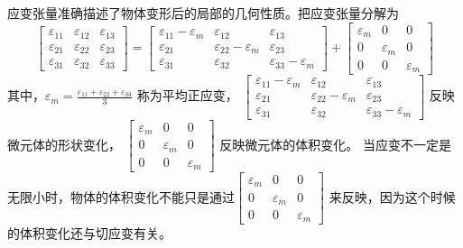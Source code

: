 \documentclass[12pt,a4paper]{article}
\begin{document}
应变张量准确描述了物体变形后的局部的几何性质。把应变张量分解为
$$
\begin{bmatrix}
\varepsilon_{11} & \varepsilon_{12} & \varepsilon_{13} \\
\varepsilon_{21} & \varepsilon_{22} & \varepsilon_{23} \\
\varepsilon_{31} & \varepsilon_{32} & \varepsilon_{33}
\end{bmatrix}=\begin{bmatrix}
\varepsilon_{11}-\varepsilon_m & \varepsilon_{12} & \varepsilon_{13} \\
\varepsilon_{21} & \varepsilon_{22}-\varepsilon_m & \varepsilon_{23} \\
\varepsilon_{31} & \varepsilon_{32} & \varepsilon_{33}-\varepsilon_m
\end{bmatrix}+\begin{bmatrix}
\varepsilon_m & 0 & 0 \\
0 & \varepsilon_m & 0 \\
0 & 0 & \varepsilon_m
\end{bmatrix}
$$
其中，$\varepsilon_m=\frac{\varepsilon_{11}+\varepsilon_{22}+\varepsilon_{33}}{3}$ 称为平均正应变，
$\begin{bmatrix}
\varepsilon_{11}-\varepsilon_m & \varepsilon_{12} & \varepsilon_{13} \\
\varepsilon_{21} & \varepsilon_{22}-\varepsilon_m & \varepsilon_{23} \\
\varepsilon_{31} & \varepsilon_{32} & \varepsilon_{33}-\varepsilon_m
\end{bmatrix}$ 反映微元体的形状变化，
$\begin{bmatrix}
\varepsilon_m & 0 & 0 \\
0 & \varepsilon_m & 0 \\
0 & 0 & \varepsilon_m
\end{bmatrix}$ 反映微元体的体积变化。
当应变不一定是无限小时，物体的体积变化不能只是通过$\begin{bmatrix}
\varepsilon_m & 0 & 0 \\
0 & \varepsilon_m & 0 \\
0 & 0 & \varepsilon_m
\end{bmatrix}$ 来反映，因为这个时候的体积变化还与切应变有关。
\end{document}
